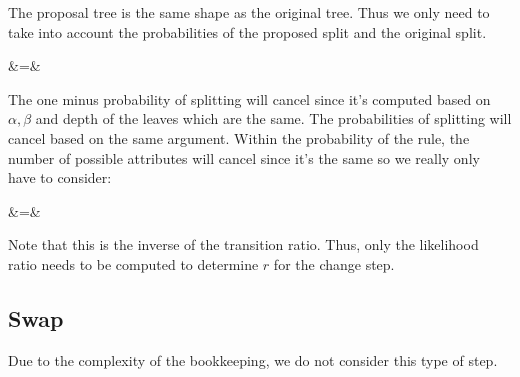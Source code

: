 The proposal tree is the same shape as the original tree. Thus we only need to take into account the probabilities of the proposed split and the original split.

\beqn
{} &=& 
\eeqn

The one minus probability of splitting will cancel since it's computed based on $\alpha, \beta$ and depth of the leaves which are the same. The probabilities of splitting will cancel based on the same argument. Within the probability of the rule, the number of possible attributes will cancel since it's the same so we really only have to consider:

\beqn
{} &=& \frac{\nrepstar}{\nrep} \frac{\nadj}{\nadjstar}
\eeqn

Note that this is the inverse of the transition ratio. Thus, only the likelihood ratio needs to be computed to determine $r$ for the change step.

\subsection*{Swap}

Due to the complexity of the bookkeeping, we do not consider this type of step.





